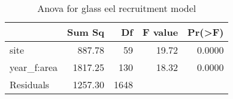 \begin{table}[htbp]
\centering
\caption[table_anova]{Anova for glass eel recruitment model} 
\begin{tabularx}{0.8\textwidth}{lrrrr}
  \hline
 & Sum Sq & Df & F value & Pr(>F) \\ 
  \hline
site & 887.78 & 59 & 19.72 & 0.0000 \\ 
  year\_f:area & 1817.25 & 130 & 18.32 & 0.0000 \\ 
  Residuals & 1257.30 & 1648 &  &  \\ 
   \hline
\end{tabularx}
\end{table}
